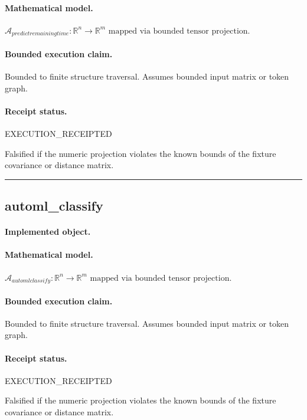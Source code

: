 \paragraph{Mathematical model.} $\mathcal{A}_{predictremainingtime} : \mathbb{R}^{n} \to \mathbb{R}^{m} \text{ mapped via bounded tensor projection}.$
\paragraph{Bounded execution claim.} Bounded to finite structure traversal. Assumes bounded input matrix or token graph.
\paragraph{Receipt status.} EXECUTION\_RECEIPTED
\begin{falsifier}
Falsified if the numeric projection violates the known bounds of the fixture covariance or distance matrix.
\end{falsifier}

\vspace{1em}\hrule\vspace{1em}
\subsection{automl\_classify}
\paragraph{Implemented object.} 
\paragraph{Mathematical model.} $\mathcal{A}_{automlclassify} : \mathbb{R}^{n} \to \mathbb{R}^{m} \text{ mapped via bounded tensor projection}.$
\paragraph{Bounded execution claim.} Bounded to finite structure traversal. Assumes bounded input matrix or token graph.
\paragraph{Receipt status.} EXECUTION\_RECEIPTED
\begin{falsifier}
Falsified if the numeric projection violates the known bounds of the fixture covariance or distance matrix.
\end{falsifier}

